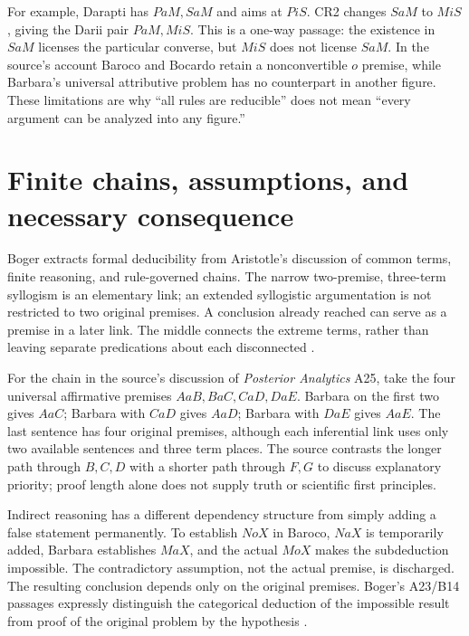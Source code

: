 For example, Darapti has \(PaM,SaM\) and aims at \(PiS\). CR2 changes
\(SaM\) to \(MiS\), giving the Darii pair \(PaM,MiS\). This is a
one-way passage: the existence in \(SaM\) licenses the particular converse,
but \(MiS\) does not license \(SaM\). In the source's account Baroco and
Bocardo retain a nonconvertible \(o\) premise, while Barbara's universal
attributive problem has no counterpart in another figure. These limitations
are why ``all rules are reducible'' does not mean ``every argument can be
analyzed into any figure.''

\section{Finite chains, assumptions, and necessary consequence}
\label{sec:p13-boger-chain-consequence}

Boger extracts formal deducibility from Aristotle's discussion of common
terms, finite reasoning, and rule-governed chains. The narrow two-premise,
three-term syllogism is an elementary link; an extended syllogistic
argumentation is not restricted to two original premises. A conclusion already
reached can serve as a premise in a later link. The middle connects the extreme
terms, rather than leaving separate predications about each disconnected
\parencite[pp.~216--227]{Boger2004UnderlyingLogic}.

For the chain in the source's discussion of \emph{Posterior Analytics} A25,
take the four universal affirmative premises \(AaB,BaC,CaD,DaE\).
Barbara on the first two gives \(AaC\); Barbara with \(CaD\) gives
\(AaD\); Barbara with \(DaE\) gives \(AaE\). The last sentence has four
original premises, although each inferential link uses only two available
sentences and three term places. The source contrasts the longer path through
\(B,C,D\) with a shorter path through \(F,G\) to discuss explanatory priority;
proof length alone does not supply truth or scientific first principles.

Indirect reasoning has a different dependency structure from simply adding a
false statement permanently. To establish \(NoX\) in Baroco, \(NaX\) is
temporarily added, Barbara establishes \(MaX\), and the actual \(MoX\)
makes the subdeduction impossible. The contradictory assumption, not the
actual premise, is discharged. The resulting conclusion depends only on the
original premises. Boger's A23/B14 passages expressly distinguish the
categorical deduction of the impossible result from proof of the original
problem by the hypothesis \parencite[pp.~227--229]{Boger2004UnderlyingLogic}.

